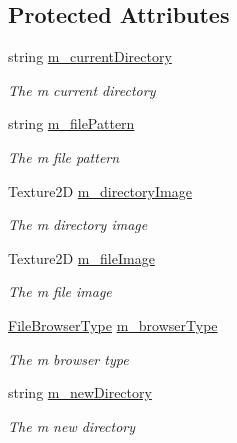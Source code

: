 \subsection*{Protected Attributes}
\begin{DoxyCompactItemize}
\item 
string \hyperlink{class_lerp2_a_p_i_editor_1_1_utility_1_1_file_browser_editor_aebfaa32bf99eaeff707b1967125e8024}{m\+\_\+current\+Directory}
\begin{DoxyCompactList}\small\item\em The m current directory \end{DoxyCompactList}\item 
string \hyperlink{class_lerp2_a_p_i_editor_1_1_utility_1_1_file_browser_editor_ad5456ae6c4d7e638661e875ad2f73b08}{m\+\_\+file\+Pattern}
\begin{DoxyCompactList}\small\item\em The m file pattern \end{DoxyCompactList}\item 
Texture2D \hyperlink{class_lerp2_a_p_i_editor_1_1_utility_1_1_file_browser_editor_a4faa63f97346f6c95278980e46c9b925}{m\+\_\+directory\+Image}
\begin{DoxyCompactList}\small\item\em The m directory image \end{DoxyCompactList}\item 
Texture2D \hyperlink{class_lerp2_a_p_i_editor_1_1_utility_1_1_file_browser_editor_af9cd761d7aa0c90bf61d6fc66919bede}{m\+\_\+file\+Image}
\begin{DoxyCompactList}\small\item\em The m file image \end{DoxyCompactList}\item 
\hyperlink{namespace_lerp2_a_p_i_1_1_utility_af5d628470963cc0f18c37055b4170bf1}{File\+Browser\+Type} \hyperlink{class_lerp2_a_p_i_editor_1_1_utility_1_1_file_browser_editor_a09e7fe601830cae7cd1cce9e10929b70}{m\+\_\+browser\+Type}
\begin{DoxyCompactList}\small\item\em The m browser type \end{DoxyCompactList}\item 
string \hyperlink{class_lerp2_a_p_i_editor_1_1_utility_1_1_file_browser_editor_ae7d673d75ba832be323d40f033e31048}{m\+\_\+new\+Directory}
\begin{DoxyCompactList}\small\item\em The m new directory \end{DoxyCompactList}\item 

\end{DoxyCompactItemize}

